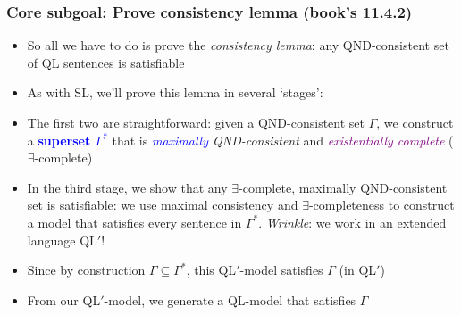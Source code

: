 \begin{frame}
\frametitle{Core subgoal: Prove consistency lemma (book's 11.4.2)}

\begin{itemize}[<+->]

\item So all we have to do is prove the \emph{consistency lemma}: any QND-consistent set of QL sentences is satisfiable

\item As with SL, we'll prove this lemma in several `stages':

\item The first two are straightforward: given a QND-consistent set $\Gamma$, we construct a \textbf{\textcolor{blue}{superset $\Gamma^{\ast}$}} that is \textit{\textcolor{blue}{maximally} QND-consistent} and \textit{\textcolor{purple}{existentially complete}} ($\exists$-complete)

\item In the third stage, we show that any $\exists$-complete, maximally QND-consistent set is \alert{satisfiable}: we use maximal consistency and $\exists$-completeness to construct a model that satisfies every sentence in $\Gamma^{\ast}$. \textit{Wrinkle}: we work in an extended language QL$'$!

\item Since by construction $\Gamma \subseteq \Gamma^{\ast}$, this QL$'$-model satisfies $\Gamma$ (in QL$'$)

\item From our QL$'$-model, we generate a QL-model that satisfies $\Gamma$  






\end{itemize}
\end{frame}

